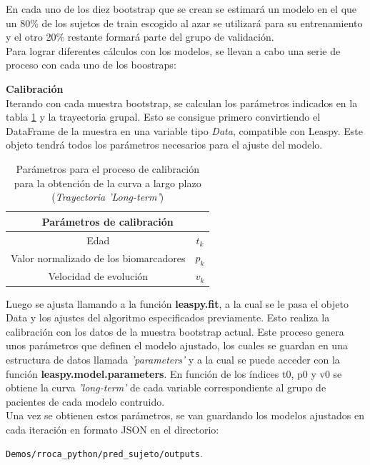 En cada uno de los diez bootstrap que se crean se estimará un modelo en el que un 80\% de los sujetos de train escogido al azar se utilizará para su entrenamiento y el otro 20\% restante formará parte del grupo de validación.
\\

Para lograr diferentes cálculos con los modelos, se llevan a cabo una serie de proceso con cada uno de los boostraps:
\begin{description}
	\item \textbf{Calibración}\\
	Iterando con cada muestra bootstrap, se calculan los parámetros indicados en la tabla \ref{tab:tabla6} y la trayectoria grupal. Esto se consigue primero convirtiendo el DataFrame de la muestra en una variable tipo \textit{Data}, compatible con Leaspy. Este objeto tendrá todos los parámetros necesarios para el ajuste del modelo. \\
	
	\begin{table}[t]
		\centering
		\begin{tabular}{|c||c|} 
			\hline
			\multicolumn{2}{|c|}{Parámetros de calibración} \\
			\toprule
			Edad &  $t_{k}$\\ 
			\hline
			Valor normalizado de los biomarcadores &  $p_{k}$  \\
			\hline
			Velocidad de evolución & $v_{k}$  \\
			
			\bottomrule
		\end{tabular}
		\caption{Parámetros para el proceso de calibración para la obtención de la curva a largo plazo (\textit{Trayectoria 'Long-term'})}
		\label{tab:tabla6}
	\end{table}
	
	Luego se ajusta llamando a la función \textbf{leaspy.fit}, a la cual se le pasa el objeto Data y los ajustes del algoritmo especificados previamente. Esto realiza la calibración con los datos de la muestra bootstrap actual. Este proceso genera unos parámetros que definen el modelo ajustado, los cuales se guardan en una estructura de datos llamada \textit{'parameters'} y a la cual se puede acceder con la función \textbf{leaspy.model.parameters}. En función de los índices t0, p0 y v0 se obtiene la curva \textit{'long-term'} de cada variable correspondiente al grupo de pacientes de cada modelo contruido. \\

	
	Una vez se obtienen estos parámetros, se van guardando los modelos ajustados en cada iteración en formato JSON en el directorio:\\
	\begin{center}
		\texttt{Demos/rroca\_python/pred\_sujeto/outputs}. 
	\end{center} 
	

\end{description}
